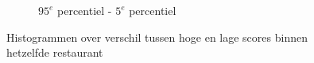 \begin{figure}[H]
\begin{subfigure}{.5\textwidth}
        \caption{$95^e$ percentiel - $5^e$ percentiel}
        \label{fig:chapt3_verdeling_score_min_max_percentiel_restaurant}
    \end{subfigure}
    \caption{Histogrammen over verschil tussen hoge en lage scores binnen hetzelfde restaurant}
    \label{fig:chapt3_verdeling_score_min_max_combined_restaurants}
\end{figure}
